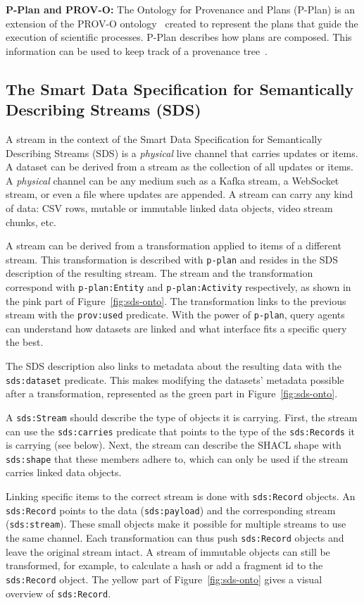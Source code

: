\textbf{P-Plan and PROV-O:} The Ontology for Provenance and Plans (P-Plan)
is an extension of the PROV-O ontology~\cite{PROVO} created to represent the
plans that guide the execution of scientific processes. P-Plan describes how
plans are composed. This information can be used to keep track of a
provenance tree~\cite{PPLAN}.

\subsection{The Smart Data Specification for Semantically Describing
Streams (SDS)}

A stream in the context of the Smart Data Specification for Semantically
Describing Streams (SDS) is a \emph{physical} live channel that carries
updates or items. A dataset can be derived from a stream as the collection
of all updates or items. A \emph{physical} channel can be any medium such as
a Kafka stream, a WebSocket stream, or even a file where updates are
appended. A stream can carry any kind of data: CSV rows, mutable or
immutable linked data objects, video stream chunks, etc.

A stream can be derived from a transformation applied to items of a
different stream. This transformation is described with \texttt{p-plan} and
resides in the SDS description of the resulting stream. The stream and the
transformation correspond with \texttt{p-plan:Entity} and
\texttt{p-plan:Activity} respectively, as shown in the pink part of
Figure~\ref{fig:sds-onto}. The transformation links to the previous stream
with the \texttt{prov:used} predicate. With the power of \texttt{p-plan},
query agents can understand how datasets are linked and what interface fits
a specific query the best.

The SDS description also links to metadata about the resulting data with
the \texttt{sds:dataset} predicate. This makes modifying the datasets'
metadata possible after a transformation, represented as the green part in
Figure~\ref{fig:sds-onto}.

A \texttt{sds:Stream} should describe the type of objects it is carrying.
First, the stream can use the \texttt{sds:carries} predicate that points to
the type of the \texttt{sds:Records} it is carrying (see below). Next, the
stream can describe the SHACL shape with \texttt{sds:shape} that these
members adhere to, which can only be used if the stream carries linked data
objects.

Linking specific items to the correct stream is done with
\texttt{sds:Record} objects. An \texttt{sds:Record} points to the data
(\texttt{sds:payload}) and the corresponding stream (\texttt{sds:stream}).
These small objects make it possible for multiple streams to use the same
channel. Each transformation can thus push \texttt{sds:Record} objects and
leave the original stream intact. A stream of immutable objects can still be
transformed, for example, to calculate a hash or add a fragment id to the
\texttt{sds:Record} object. The yellow part of Figure~\ref{fig:sds-onto}
gives a visual overview of \texttt{sds:Record}.

